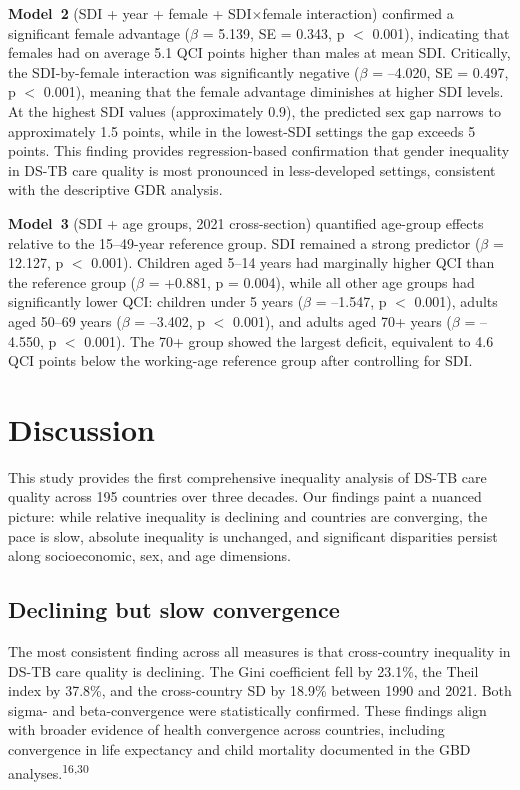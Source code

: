 \documentclass[12pt]{article}
\begin{document}
\textbf{Model~2} (SDI + year + female + SDI$\times$female interaction) confirmed a significant female advantage ($\beta$ = 5.139, SE = 0.343, p $<$ 0.001), indicating that females had on average 5.1 QCI points higher than males at mean SDI. Critically, the SDI-by-female interaction was significantly negative ($\beta$ = --4.020, SE = 0.497, p $<$ 0.001), meaning that the female advantage diminishes at higher SDI levels. At the highest SDI values (approximately 0.9), the predicted sex gap narrows to approximately 1.5 points, while in the lowest-SDI settings the gap exceeds 5 points. This finding provides regression-based confirmation that gender inequality in DS-TB care quality is most pronounced in less-developed settings, consistent with the descriptive GDR analysis.

\textbf{Model~3} (SDI + age groups, 2021 cross-section) quantified age-group effects relative to the 15--49-year reference group. SDI remained a strong predictor ($\beta$ = 12.127, p $<$ 0.001). Children aged 5--14 years had marginally higher QCI than the reference group ($\beta$ = +0.881, p = 0.004), while all other age groups had significantly lower QCI: children under 5 years ($\beta$ = --1.547, p $<$ 0.001), adults aged 50--69 years ($\beta$ = --3.402, p $<$ 0.001), and adults aged 70+ years ($\beta$ = --4.550, p $<$ 0.001). The 70+ group showed the largest deficit, equivalent to 4.6 QCI points below the working-age reference group after controlling for SDI.


\section{Discussion}

This study provides the first comprehensive inequality analysis of DS-TB care quality across 195 countries over three decades. Our findings paint a nuanced picture: while relative inequality is declining and countries are converging, the pace is slow, absolute inequality is unchanged, and significant disparities persist along socioeconomic, sex, and age dimensions.

\subsection{Declining but slow convergence}

The most consistent finding across all measures is that cross-country inequality in DS-TB care quality is declining. The Gini coefficient fell by 23.1\%, the Theil index by 37.8\%, and the cross-country SD by 18.9\% between 1990 and 2021. Both sigma- and beta-convergence were statistically confirmed. These findings align with broader evidence of health convergence across countries, including convergence in life expectancy and child mortality documented in the GBD analyses.\textsuperscript{16,30}
\end{document}
